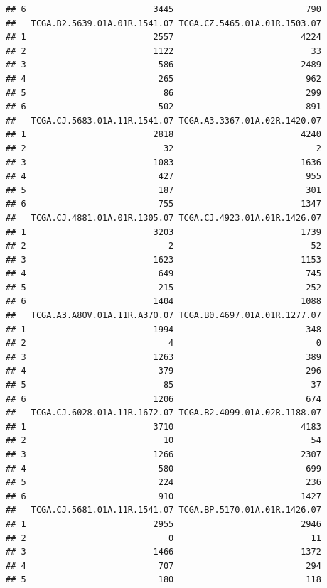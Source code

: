 \documentclass[
]{article}
\begin{document}
\begin{verbatim}
## 6                         3445                          790
##   TCGA.B2.5639.01A.01R.1541.07 TCGA.CZ.5465.01A.01R.1503.07
## 1                         2557                         4224
## 2                         1122                           33
## 3                          586                         2489
## 4                          265                          962
## 5                           86                          299
## 6                          502                          891
##   TCGA.CJ.5683.01A.11R.1541.07 TCGA.A3.3367.01A.02R.1420.07
## 1                         2818                         4240
## 2                           32                            2
## 3                         1083                         1636
## 4                          427                          955
## 5                          187                          301
## 6                          755                         1347
##   TCGA.CJ.4881.01A.01R.1305.07 TCGA.CJ.4923.01A.01R.1426.07
## 1                         3203                         1739
## 2                            2                           52
## 3                         1623                         1153
## 4                          649                          745
## 5                          215                          252
## 6                         1404                         1088
##   TCGA.A3.A8OV.01A.11R.A37O.07 TCGA.B0.4697.01A.01R.1277.07
## 1                         1994                          348
## 2                            4                            0
## 3                         1263                          389
## 4                          379                          296
## 5                           85                           37
## 6                         1206                          674
##   TCGA.CJ.6028.01A.11R.1672.07 TCGA.B2.4099.01A.02R.1188.07
## 1                         3710                         4183
## 2                           10                           54
## 3                         1266                         2307
## 4                          580                          699
## 5                          224                          236
## 6                          910                         1427
##   TCGA.CJ.5681.01A.11R.1541.07 TCGA.BP.5170.01A.01R.1426.07
## 1                         2955                         2946
## 2                            0                           11
## 3                         1466                         1372
## 4                          707                          294
## 5                          180                          118

\end{verbatim}
\end{document}
